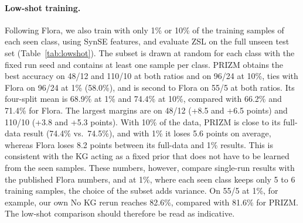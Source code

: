 \documentclass[11pt]{article}
\begin{document}
\paragraph{Low-shot training.}
Following Flora, we also train with only 1\% or 10\% of the training samples of each seen class, using SynSE features, and evaluate ZSL on the full unseen test set (Table~\ref{tab:lowshot}). The subset is drawn at random for each class with the fixed run seed and contains at least one sample per class. PRIZM obtains the best accuracy on 48/12 and 110/10 at both ratios and on 96/24 at 10\%, ties with Flora on 96/24 at 1\% (58.0\%), and is second to Flora on 55/5 at both ratios. Its four-split mean is 68.9\% at 1\% and 74.4\% at 10\%, compared with 66.2\% and 71.4\% for Flora. The largest margins are on 48/12 (+8.5 and +6.5 points) and 110/10 (+3.8 and +5.3 points). With 10\% of the data, PRIZM is close to its full-data result (74.4\% vs.\ 74.5\%), and with 1\% it loses 5.6 points on average, whereas Flora loses 8.2 points between its full-data and 1\% results. This is consistent with the KG acting as a fixed prior that does not have to be learned from the seen samples. These numbers, however, compare single-run results with the published Flora numbers, and at 1\%, where each seen class keeps only 5 to 6 training samples, the choice of the subset adds variance. On 55/5 at 1\%, for example, our own No KG rerun reaches 82.6\%, compared with 81.6\% for PRIZM. The low-shot comparison should therefore be read as indicative.
\end{document}
